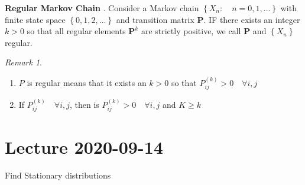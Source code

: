 \documentclass{article}
\theoremstyle{remark}
\newtheorem*{remark}{Remark}
\begin{document}
\begin{definition}
  \textbf{Regular Markov Chain} . Consider a Markov chain $\left\{ X_{n}: \quad  n = 0,1,\ldots  \right\}$ with finite state space $ \left\{ 0,1,2, \ldots \right\}$ and transition matrix $\mathbf{P}$. IF there exists an integer $k >0$ so that all regular elements $\mathbf{P}^{k}$ are strictly positive, we call $\mathbf{P}$ and $\left\{ X_{n} \right\}$ regular.
\end{definition}

\begin{remark}
   \begin{enumerate}
     \item $P$ is regular means that it exists an $k > 0$ so that $P^{(k)} _{ ij} > 0 \quad  \forall i,j $
     \item  If $P^{(k)} _{ij} \quad  \forall i,j $, then is $P^{(k)} _{ij} > 0 \quad  \forall i,j $ and $K \ge k$
   \end{enumerate}
\end{remark}

\newpage
\section{Lecture 2020-09-14}%
\label{sec:lecture_2020_09_14}

Find Stationary distributions
\end{document}
